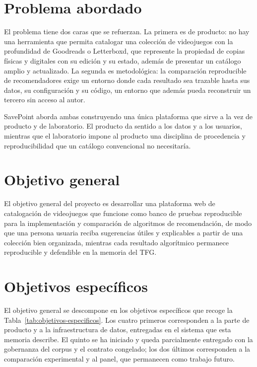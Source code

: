 \section{Problema abordado}\label{sec:intro-problema}

El problema tiene dos caras que se refuerzan. La primera es de producto: no hay una
herramienta que permita catalogar una colección de videojuegos con la profundidad de
Goodreads o Letterboxd, que represente la propiedad de copias físicas y digitales con su
edición y su estado, además de presentar un catálogo amplio y actualizado. La segunda es
metodológica: la comparación reproducible de recomendadores exige un entorno donde cada
resultado sea trazable hasta sus datos, su configuración y su código, un entorno que además
pueda reconstruir un tercero sin acceso al autor.

SavePoint aborda ambas construyendo una única plataforma que sirve a la vez de producto y de
laboratorio. El producto da sentido a los datos y a los usuarios, mientras que el laboratorio
impone al producto una disciplina de procedencia y reproducibilidad que un catálogo
convencional no necesitaría.

\section{Objetivo general}\label{sec:intro-objetivo-general}

El objetivo general del proyecto es desarrollar una plataforma web de catalogación de
videojuegos que funcione como banco de pruebas reproducible para la implementación y
comparación de algoritmos de recomendación, de modo que una persona usuaria reciba
sugerencias útiles y explicables a partir de una colección bien organizada, mientras cada
resultado algorítmico permanece reproducible y defendible en la memoria del TFG.

\section{Objetivos específicos}\label{sec:intro-objetivos-especificos}

El objetivo general se descompone en los objetivos específicos que recoge la
Tabla~\ref{tab:objetivos-especificos}. Los cuatro primeros corresponden a la parte de
producto y a la infraestructura de datos, entregadas en el sistema que esta memoria
describe. El quinto se ha iniciado y queda parcialmente entregado con la gobernanza del
corpus y el contrato congelado; los dos últimos corresponden a la comparación experimental y
al panel, que permanecen como trabajo futuro.

